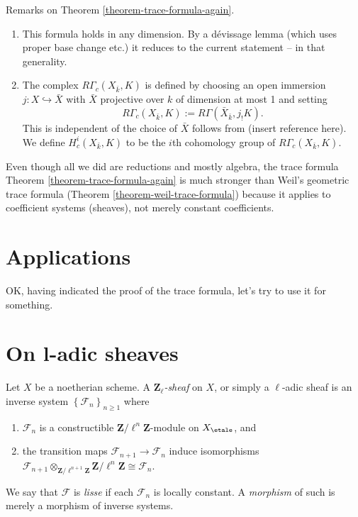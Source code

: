 \begin{remark}
\label{remark-on-trace-formula-again}
Remarks on Theorem \ref{theorem-trace-formula-again}.
\begin{enumerate}
\item
This formula holds in any dimension. By a d\'evissage lemma (which uses proper
base change etc.) it reduces to the current statement -- in that generality.
\item
The complex $R\Gamma_c(X_{\bar k}, K)$ is defined by choosing an open immersion
$j: X \hookrightarrow \bar X$ with $\bar X$ projective over $k$ of dimension at
most 1 and setting
$$
R\Gamma_c(X_{\bar k}, K) := R\Gamma(\bar X_{\bar k}, j_!K).
$$
This is independent of the choice of $\bar X$ follows from
(insert reference here). We define $H^i_c(X_{\bar k}, K)$
to be the $i$th cohomology group of $R\Gamma_c(X_{\bar k}, K)$.
\end{enumerate}
\end{remark}

\begin{remark}
\label{remark-stronger}
Even though all we did are reductions and mostly algebra, the trace formula
Theorem \ref{theorem-trace-formula-again} is much stronger than
Weil's geometric trace formula (Theorem \ref{theorem-weil-trace-formula})
because it applies to coefficient
systems (sheaves), not merely constant coefficients.
\end{remark}


\section{Applications}
\label{section-applications}

\noindent
OK, having indicated the proof of the trace formula, let's try to use it
for something.





\section{On l-adic sheaves}
\label{section-l-adic-sheaves}

\begin{definition}
\label{definition-l-adic-sheaf}
Let $X$ be a noetherian scheme. A
{\it $\mathbf{Z}_\ell$-sheaf} on $X$, or simply a
{$\ell$-adic sheaf} is an
inverse system $\left\{\mathcal{F}_n\right\}_{n\geq 1}$ where
\begin{enumerate}
\item
$\mathcal{F}_n$ is a constructible $\mathbf{Z}/\ell^n\mathbf{Z}$-module on
$X_\etale$, and
\item
the transition maps $\mathcal{F}_{n+1}\to \mathcal{F}_n$ induce isomorphisms
$\mathcal{F}_{n+1} \otimes_{\mathbf{Z}/\ell^{n+1}\mathbf{Z}}
\mathbf{Z}/\ell^n\mathbf{Z} \cong \mathcal{F}_n$.
\end{enumerate}
We say that $\mathcal{F}$ is {\it lisse} if each $\mathcal{F}_n$ is locally
constant. A {\it morphism} of such is merely a morphism of inverse systems.
\end{definition}

